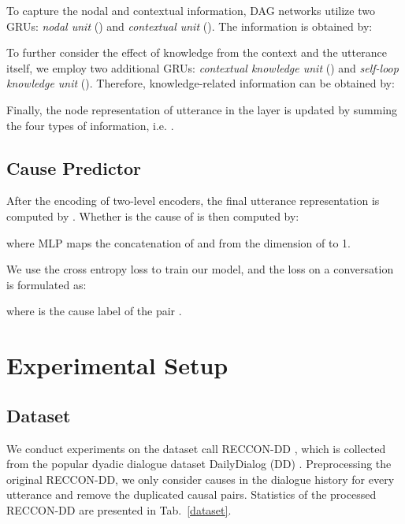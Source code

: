 \documentclass{article}
\begin{document}
To capture the nodal and contextual information, DAG networks utilize two GRUs: \textit{nodal unit} () and \textit{contextual unit} (). The information is obtained by:


To further consider the effect of knowledge from the context and the utterance itself, we employ two additional GRUs: \textit{contextual knowledge unit} () and \textit{self-loop knowledge unit} (). Therefore, knowledge-related information can be obtained by:


Finally, the node representation of utterance  in the  layer is updated by summing the four types of information, i.e. . 
\subsection{Cause Predictor}
After the encoding of two-level encoders, the final utterance representation is computed by  \cite{DAG}. Whether  is the cause of  is then computed by:

where MLP maps the concatenation of  and  from the dimension of  to 1. 

We use the cross entropy loss to train our model, and the loss on a conversation is formulated as:

where  is the cause label of the pair . 

\section{Experimental Setup}

\subsection{Dataset}

We conduct experiments on the dataset call RECCON-DD \cite{RECCON}, which is collected from the popular dyadic dialogue dataset DailyDialog (DD) \cite{DailyDialog}. Preprocessing the original RECCON-DD, we only consider causes in the dialogue history for every utterance and remove the duplicated causal pairs. Statistics of the processed RECCON-DD are presented in Tab.~\ref{dataset}. 
\end{document}
